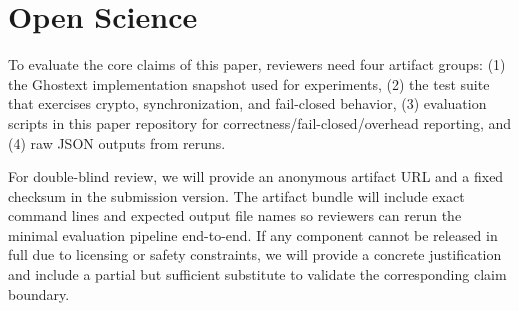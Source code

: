 \section{Open Science}
To evaluate the core claims of this paper, reviewers need four artifact groups: (1) the Ghostext implementation snapshot used for experiments, (2) the test suite that exercises crypto, synchronization, and fail-closed behavior, (3) evaluation scripts in this paper repository for correctness/fail-closed/overhead reporting, and (4) raw JSON outputs from reruns.

For double-blind review, we will provide an anonymous artifact URL and a fixed checksum in the submission version. The artifact bundle will include exact command lines and expected output file names so reviewers can rerun the minimal evaluation pipeline end-to-end. If any component cannot be released in full due to licensing or safety constraints, we will provide a concrete justification and include a partial but sufficient substitute to validate the corresponding claim boundary.
